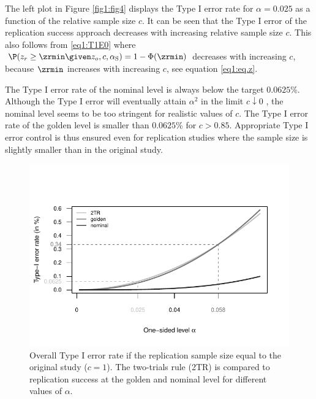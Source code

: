 The left plot in Figure \ref{fig1:fig4} displays the Type I error rate for
$\alpha=0.025$ as a function of the relative sample size $c$. It can be seen
that the Type I error of the replication success approach decreases with
increasing relative sample size $c$. This also follows from \eqref{eq1:T1E0}
where \mbox{$\P(z_r \geq \zrmin \given z_o, c, \alpha_{\mathrm{S}}) = 1 - \Phi(\zrmin)$}
decreases with increasing $c$, because $\zrmin$ increases with increasing $c$,
see equation \eqref{eq1:eq.z}.


The Type I error rate of the nominal level is always below the target
$0.0625$\%. Although the Type I error will eventually attain $\alpha^2$ in the
limit $c \downarrow 0$ \citep[Section 3.4]{Held2020}, the nominal level seems to
be too stringent for realistic values of $c$. The Type I error rate of the
golden level is smaller than $0.0625$\% for $c >0.85$. Appropriate Type I error
control is thus ensured even for replication studies where the sample size is
slightly smaller than in the original study.

\begin{figure}[!ht]
\begin{center}

\begin{knitrout}
\color{fgcolor}

{\centering \includegraphics[width=\maxwidth]{images/paper1/fig5-1}

}


\end{knitrout}

\end{center}
\caption{Overall Type I error rate if the replication sample size equal to the
  original study ($c=1$). The two-trials rule (2TR) is compared to replication
  success at the golden and nominal level for different values of $\alpha$.}
\label{fig1:fig5}
\end{figure}

